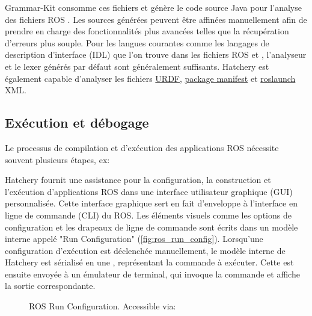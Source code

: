 Grammar-Kit consomme ces fichiers et génère le code source Java pour l'analyse des fichiers ROS \href{https://wiki.ros.org/msg}{}. Les sources générées peuvent être affinées manuellement afin de prendre en charge des fonctionnalités plus avancées telles que la récupération d'erreurs plus souple. Pour les langues courantes comme les langages de description d'interface (IDL) que l'on trouve dans les fichiers ROS \href{https://wiki.ros.org/msg}{} et \href{https://wiki.ros.org/srv}{}, l'analyseur et le lexer générés par défaut sont généralement suffisants. Hatchery est également capable d'analyser les fichiers \href{https://wiki.ros.org/urdf}{URDF}, \href{https://wiki.ros.org/Manifest}{package manifest} et \href{https://wiki.ros.org/roslaunch/XML}{roslaunch} XML.

\subsection{Exécution et débogage}

Le processus de compilation et d'exécution des applications ROS nécessite souvent plusieurs étapes, ex:
%
%
Hatchery fournit une assistance pour la configuration, la construction et l'exécution d'applications ROS dans une interface utilisateur graphique (GUI) personnalisée. Cette interface graphique sert en fait d'enveloppe à l'interface en ligne de commande (CLI) du ROS. Les éléments visuels comme les options de configuration et les drapeaux de ligne de commande sont écrits dans un modèle interne appelé "Run Configuration" (\autoref{fig:ros_run_config}). Lorsqu'une configuration d'exécution est déclenchée manuellement, le modèle interne de Hatchery est sérialisé en une , représentant la commande à exécuter. Cette  est ensuite envoyée à un émulateur de terminal, qui invoque la commande et affiche la sortie correspondante.

\begin{figure}
\centering
{}
\caption{ROS Run Configuration. Accessible via: }
\label{fig:ros_run_config}
\end{figure}

